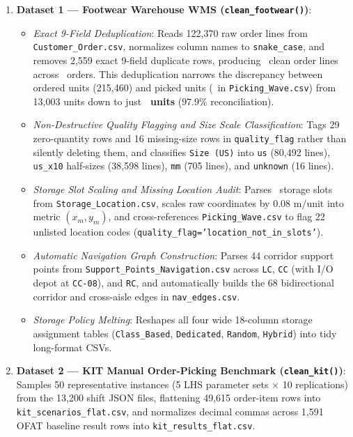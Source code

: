 \documentclass[11pt,a4paper]{article}
\begin{document}
\begin{enumerate}[leftmargin=*]
    \item \textbf{Dataset 1 --- Footwear Warehouse WMS (\texttt{clean\_footwear()})}:
    \begin{itemize}
        \item \textit{Exact 9-Field Deduplication}: Reads 122,370 raw order lines from \texttt{Customer\_Order.csv}, normalizes column names to \texttt{snake\_case}, and removes 2,559 exact 9-field duplicate rows, producing \TotalOrderLines~clean order lines across \TotalOrders~orders. This deduplication narrows the discrepancy between ordered units (215,460) and picked units (\TotalPicks~in \texttt{Picking\_Wave.csv}) from 13,003 units down to just \textbf{\UnitGapReconciled~units} ($97.9\%$ reconciliation).
        \item \textit{Non-Destructive Quality Flagging and Size Scale Classification}: Tags 29 zero-quantity rows and 16 missing-size rows in \texttt{quality\_flag} rather than silently deleting them, and classifies \texttt{Size (US)} into \texttt{us} (80,492 lines), \texttt{us\_x10} half-sizes (38,598 lines), \texttt{mm} (705 lines), and \texttt{unknown} (16 lines).
        \item \textit{Storage Slot Scaling and Missing Location Audit}: Parses \TotalLocations~storage slots from \texttt{Storage\_Location.csv}, scales raw coordinates by $0.08\text{ m/unit}$ into metric $(x_m, y_m)$, and cross-references \texttt{Picking\_Wave.csv} to flag 22 unlisted location codes (\texttt{quality\_flag='location\_not\_in\_slots'}).
        \item \textit{Automatic Navigation Graph Construction}: Parses 44 corridor support points from \texttt{Support\_Points\_Navigation.csv} across \texttt{LC}, \texttt{CC} (with I/O depot at \texttt{CC-08}), and \texttt{RC}, and automatically builds the 68 bidirectional corridor and cross-aisle edges in \texttt{nav\_edges.csv}.
        \item \textit{Storage Policy Melting}: Reshapes all four wide 18-column storage assignment tables (\texttt{Class\_Based}, \texttt{Dedicated}, \texttt{Random}, \texttt{Hybrid}) into tidy long-format CSVs.
    \end{itemize}

    \item \textbf{Dataset 2 --- KIT Manual Order-Picking Benchmark (\texttt{clean\_kit()})}:
    Samples 50 representative instances (5 LHS parameter sets $\times$ 10 replications) from the 13,200 shift JSON files, flattening 49,615 order-item rows into \texttt{kit\_scenarios\_flat.csv}, and normalizes decimal commas across 1,591 OFAT baseline result rows into \texttt{kit\_results\_flat.csv}.


\end{enumerate}
\end{document}
